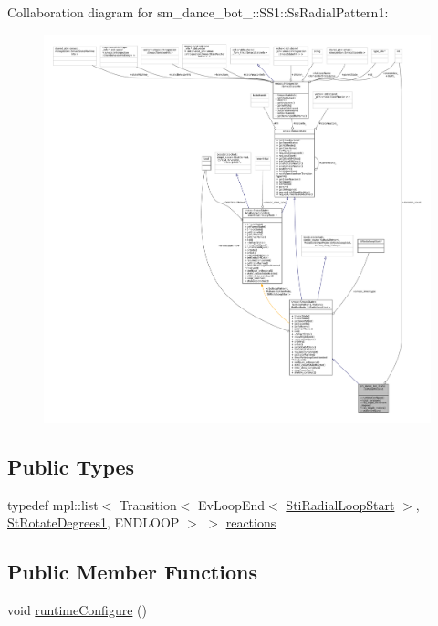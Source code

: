 Collaboration diagram for sm\+\_\+dance\+\_\+bot\+\_\+:\+:S\+S1\+:\+:Ss\+Radial\+Pattern1\+:
\nopagebreak
\begin{figure}[H]
\begin{center}
\leavevmode
\includegraphics[width=350pt]{structsm__dance__bot__3_1_1SS1_1_1SsRadialPattern1__coll__graph}
\end{center}
\end{figure}
\subsection*{Public Types}
\begin{DoxyCompactItemize}
\item 
typedef mpl\+::list$<$ Transition$<$ Ev\+Loop\+End$<$ \hyperlink{structsm__dance__bot__3_1_1radial__motion__states_1_1StiRadialLoopStart}{Sti\+Radial\+Loop\+Start} $>$, \hyperlink{structsm__dance__bot__3_1_1StRotateDegrees1}{St\+Rotate\+Degrees1}, E\+N\+D\+L\+O\+OP $>$ $>$ \hyperlink{structsm__dance__bot__3_1_1SS1_1_1SsRadialPattern1_ab47da32146955fab5a626e246dec2707}{reactions}
\end{DoxyCompactItemize}
\subsection*{Public Member Functions}
\begin{DoxyCompactItemize}
\item 
void \hyperlink{structsm__dance__bot__3_1_1SS1_1_1SsRadialPattern1_a4f9f016e57f56fd5a2d80a84e825051d}{runtime\+Configure} ()
\end{DoxyCompactItemize}
